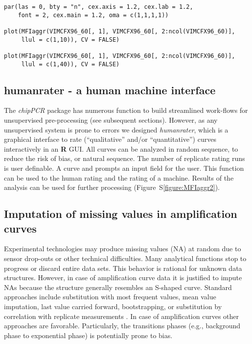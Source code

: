 \documentclass[twocolumn]{bmcart}%
\begin{document}
\begin{figure*}
\begin{verbatim}
par(las = 0, bty = "n", cex.axis = 1.2, cex.lab = 1.2, 
    font = 2, cex.main = 1.2, oma = c(1,1,1,1))

plot(MFIaggr(VIMCFX96_60[, 1], VIMCFX96_60[, 2:ncol(VIMCFX96_60)], 
     llul = c(1,10)), CV = FALSE)

plot(MFIaggr(VIMCFX96_60[, 1], VIMCFX96_60[, 2:ncol(VIMCFX96_60)], 
     llul = c(1,40)), CV = FALSE)
\end{verbatim}
\end{figure*}



\subsection*{humanrater - a human machine interface}

The \emph{chipPCR} package has numerous function to build streamlined work-flows 
for unsupervised pre-processing (see subsequent sections). However, as any 
unsupervised system is prone to errors we designed \textsl{humanrater}, which is 
a graphical interface to rate (``qualitative'' and/or ``quantitative'') curves 
interactively in an \textbf{R} GUI. All curves can be analyzed in random 
sequence, to reduce the risk of bias, or natural sequence. The number of 
replicate rating runs is user definable. A curve and prompts an input field for 
the user. This function can be used to the human rating and the rating of a 
machine. Results of the analysis can be used for further processing 
(Figure~S\ref{figure:MFIaggr2}).

\subsection*{Imputation of missing values in amplification curves}

  Experimental technologies may produce missing values (NA) at 
random due to sensor drop-outs or other technical difficulties. Many analytical 
functions stop to progress or discard entire data sets. This 
behavior is rational for unknown data structures. However, in case of 
amplification curve data it is justified to impute NAs because the structure 
generally resembles an S-shaped curve. Standard approaches include substitution 
with most frequent values, mean value imputation, last value carried forward, 
bootstrapping, or substitution by correlation with replicate measurements 
\cite{Harrell_2001}. In case of amplification curves other approaches are 
favorable. Particularly, the transitions phases (e.g., background phase to 
exponential phase) is potentially prone to bias.
\end{document}
